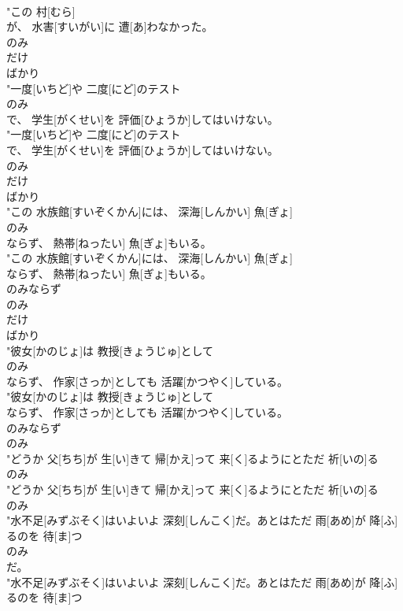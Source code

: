 \documentclass[8pt]{extreport}
\begin{document}
\begin{CJK}{UTF8}{min}
\\	"この 村[むら]
\\	が、 水害[すいがい]に 遭[あ]わなかった。
\\	のみ
\\	だけ 
\\	ばかり 
\\	"一度[いちど]や 二度[にど]のテスト
\\	のみ
\\	で、 学生[がくせい]を 評価[ひょうか]してはいけない。
\\	"一度[いちど]や 二度[にど]のテスト
\\	で、 学生[がくせい]を 評価[ひょうか]してはいけない。
\\	のみ
\\	だけ 
\\	ばかり 
\\	"この 水族館[すいぞくかん]には、 深海[しんかい] 魚[ぎょ]
\\	のみ
\\	ならず、 熱帯[ねったい] 魚[ぎょ]もいる。
\\	"この 水族館[すいぞくかん]には、 深海[しんかい] 魚[ぎょ]
\\	ならず、 熱帯[ねったい] 魚[ぎょ]もいる。
\\	のみならず	
\\	のみ
\\	だけ 
\\	ばかり 
\\	"彼女[かのじょ]は 教授[きょうじゅ]として
\\	のみ
\\	ならず、 作家[さっか]としても 活躍[かつやく]している。
\\	"彼女[かのじょ]は 教授[きょうじゅ]として
\\	ならず、 作家[さっか]としても 活躍[かつやく]している。
\\	のみならず	
\\	のみ
\\	"どうか 父[ちち]が 生[い]きて 帰[かえ]って 来[く]るようにとただ 祈[いの]る
\\	のみ
\\	"どうか 父[ちち]が 生[い]きて 帰[かえ]って 来[く]るようにとただ 祈[いの]る
\\	のみ
\\	"水不足[みずぶそく]はいよいよ 深刻[しんこく]だ。あとはただ 雨[あめ]が 降[ふ]るのを 待[ま]つ
\\	のみ
\\	だ。
\\	"水不足[みずぶそく]はいよいよ 深刻[しんこく]だ。あとはただ 雨[あめ]が 降[ふ]るのを 待[ま]つ

\end{CJK}
\end{document}
